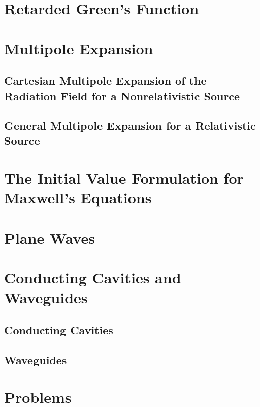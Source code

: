 \section{Retarded Green's Function}\label{sec:5.2}

\section{Multipole Expansion}\label{sec:5.3}

\subsection{Cartesian Multipole Expansion of the Radiation Field for a Nonrelativistic Source}

\subsection{General Multipole Expansion for a Relativistic Source}

\section{The Initial Value Formulation for Maxwell's Equations}\label{sec:5.4}

\section{Plane Waves}\label{sec:5.5}

\section{Conducting Cavities and Waveguides}\label{sec:5.6}

\subsection{Conducting Cavities}

\subsection{Waveguides}


\section*{Problems}


